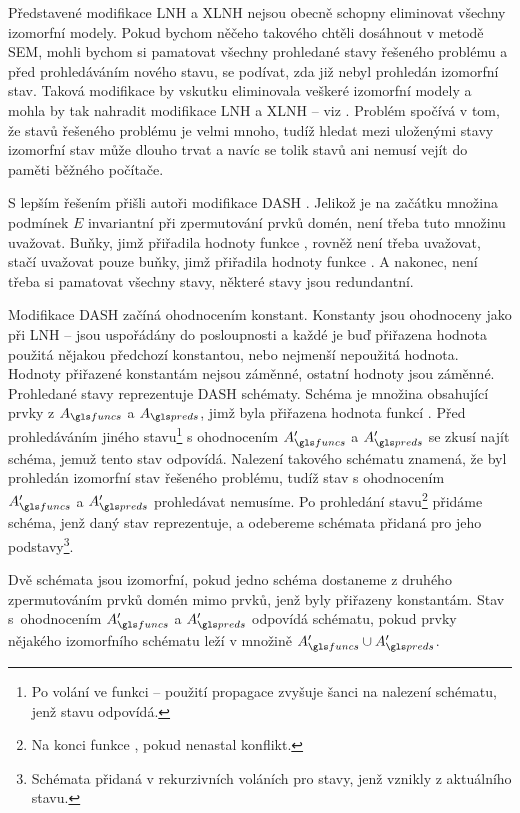 Představené modifikace LNH a XLNH nejsou obecně schopny eliminovat všechny
izomorfní modely. Pokud bychom něčeho takového chtěli dosáhnout
v metodě SEM, mohli bychom si pamatovat všechny prohledané
stavy řešeného problému a před prohledáváním nového stavu,
se podívat, zda již nebyl prohledán izomorfní stav.
Taková modifikace by vskutku eliminovala veškeré izomorfní modely
a mohla by tak nahradit modifikace LNH a XLNH -- viz
\cite{audemard2001symmetry}.
Problém spočívá v tom, že stavů řešeného problému
je velmi mnoho, tudíž hledat mezi uloženými stavy izomorfní stav může
dlouho trvat a navíc se tolik stavů ani nemusí vejít do paměti
běžného počítače.

S lepším řešením přišli autoři modifikace DASH \cite{dash}.
Jelikož je na začátku množina podmínek $E$ invariantní
při zpermutování prvků domén, není třeba tuto množinu uvažovat.
Buňky, jimž přiřadila hodnoty funkce ,
rovněž není třeba uvažovat, stačí uvažovat pouze buňky,
jimž přiřadila hodnoty funkce .
A nakonec, není třeba si pamatovat všechny stavy,
některé stavy jsou redundantní.

Modifikace DASH začíná ohodnocením konstant.
Konstanty jsou ohodnoceny jako při LNH -- jsou uspořádány do posloupnosti
a každé je buď přiřazena hodnota použitá nějakou předchozí konstantou,
nebo nejmenší nepoužitá hodnota. Hodnoty přiřazené konstantám
nejsou záměnné, ostatní hodnoty jsou záměnné.
Prohledané stavy reprezentuje DASH schématy. Schéma je množina
obsahující prvky z $A_\funcs$ a $A_\preds$, jimž byla přiřazena
hodnota funkcí . Před prohledáváním jiného
stavu\footnote{Po volání  ve funkci  --
použití propagace zvyšuje šanci na nalezení schématu, jenž
stavu odpovídá.}
s ohodnocením $A'_\funcs$ a $A'_\preds$ se zkusí najít schéma,
jemuž tento stav odpovídá. Nalezení takového schématu znamená,
že byl prohledán izomorfní stav řešeného problému, tudíž
stav s ohodnocením $A'_\funcs$ a $A'_\preds$ prohledávat nemusíme.
Po prohledání stavu\footnote{Na konci funkce ,
pokud nenastal konflikt.} přidáme schéma,
jenž daný stav reprezentuje,
a odebereme schémata přidaná pro jeho
podstavy\footnote{Schémata přidaná v rekurzivních voláních pro stavy,
jenž vznikly z aktuálního stavu.}.

Dvě schémata jsou izomorfní,
pokud jedno schéma dostaneme z druhého zpermutováním prvků domén mimo
prvků, jenž byly přiřazeny konstantám.
Stav s~ohodnocením $A'_\funcs$ a $A'_\preds$ odpovídá schématu, pokud
prvky nějakého izomorfního schématu leží v množině $A'_\funcs \cup A'_\preds$.

